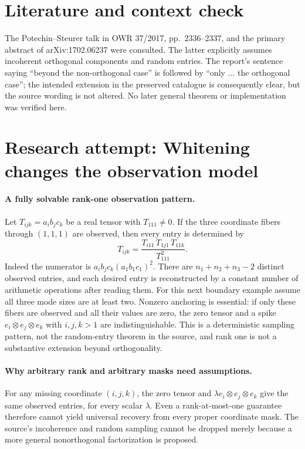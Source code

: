 \documentclass[11pt]{article}
\begin{document}
\section{Literature and context check}
The Potechin--Steurer talk in OWR 37/2017, pp.~2336--2337, and the primary abstract of arXiv:1702.06237 were consulted. The latter explicitly assumes incoherent orthogonal components and random entries. The report's sentence saying ``beyond the non-orthogonal case'' is followed by ``only ... the orthogonal case''; the intended extension in the preserved catalogue is consequently clear, but the source wording is not altered. No later general theorem or implementation was verified here.
\section{Research attempt: Whitening changes the observation model}

\paragraph{A fully solvable rank-one observation pattern.}
Let $T_{ijk}=a_i b_j c_k$ be a real tensor with $T_{111}\ne0$. If the three coordinate fibers through $(1,1,1)$ are observed, then every entry is determined by
\[
 T_{ijk}=\frac{T_{i11}\,T_{1j1}\,T_{11k}}{T_{111}^2}.
\]
Indeed the numerator is $a_i b_j c_k(a_1b_1c_1)^2$. There are $n_1+n_2+n_3-2$ distinct observed entries, and each desired entry is reconstructed by a constant number of arithmetic operations after reading them. For this next boundary example assume all three mode sizes are at least two. Nonzero anchoring is essential: if only these fibers are observed and all their values are zero, the zero tensor and a spike $e_i\otimes e_j\otimes e_k$ with $i,j,k>1$ are indistinguishable. This is a deterministic sampling pattern, not the random-entry theorem in the source, and rank one is not a substantive extension beyond orthogonality.

\paragraph{Why arbitrary rank and arbitrary masks need assumptions.}
For any missing coordinate $(i,j,k)$, the zero tensor and $\lambda e_i\otimes e_j\otimes e_k$ give the same observed entries, for every scalar $\lambda$. Even a rank-at-most-one guarantee therefore cannot yield universal recovery from every proper coordinate mask. The source's incoherence and random sampling cannot be dropped merely because a more general nonorthogonal factorization is proposed.
\end{document}
